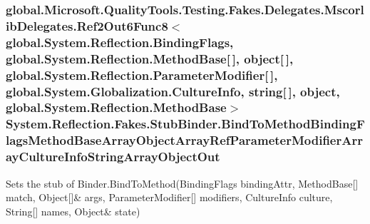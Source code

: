 \hypertarget{class_system_1_1_reflection_1_1_fakes_1_1_stub_binder_a0d98edce80caf8ba185062e59cebce28}{
\subsubsection[{Bind\-To\-Method\-Binding\-Flags\-Method\-Base\-Array\-Object\-Array\-Ref\-Parameter\-Modifier\-Array\-Culture\-Info\-String\-Array\-Object\-Out}]{\setlength{\rightskip}{0pt plus 5cm}global.\-Microsoft.\-Quality\-Tools.\-Testing.\-Fakes.\-Delegates.\-Mscorlib\-Delegates.\-Ref2\-Out6\-Func8$<$global.\-System.\-Reflection.\-Binding\-Flags, global.\-System.\-Reflection.\-Method\-Base\mbox{[}$\,$\mbox{]}, object\mbox{[}$\,$\mbox{]}, global.\-System.\-Reflection.\-Parameter\-Modifier\mbox{[}$\,$\mbox{]}, global.\-System.\-Globalization.\-Culture\-Info, string\mbox{[}$\,$\mbox{]}, object, global.\-System.\-Reflection.\-Method\-Base$>$ System.\-Reflection.\-Fakes.\-Stub\-Binder.\-Bind\-To\-Method\-Binding\-Flags\-Method\-Base\-Array\-Object\-Array\-Ref\-Parameter\-Modifier\-Array\-Culture\-Info\-String\-Array\-Object\-Out}}\label{class_system_1_1_reflection_1_1_fakes_1_1_stub_binder_a0d98edce80caf8ba185062e59cebce28}


Sets the stub of Binder.\-Bind\-To\-Method(Binding\-Flags binding\-Attr, Method\-Base\mbox{[}\mbox{]} match, Object\mbox{[}\mbox{]}\& args, Parameter\-Modifier\mbox{[}\mbox{]} modifiers, Culture\-Info culture, String\mbox{[}\mbox{]} names, Object\& state)


